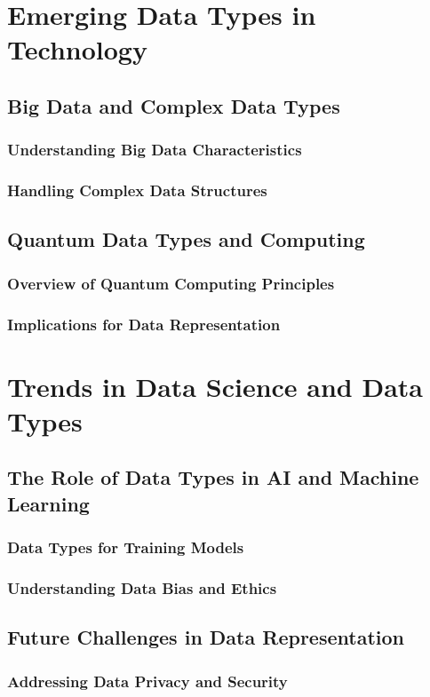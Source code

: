 \documentclass[12pt, oneside]{book}
\begin{document}
\section{Emerging Data Types in Technology}
\subsection{Big Data and Complex Data Types}
\subsubsection{Understanding Big Data Characteristics}
\subsubsection{Handling Complex Data Structures}
\subsection{Quantum Data Types and Computing}
\subsubsection{Overview of Quantum Computing Principles}
\subsubsection{Implications for Data Representation}
\section{Trends in Data Science and Data Types}
\subsection{The Role of Data Types in AI and Machine Learning}
\subsubsection{Data Types for Training Models}
\subsubsection{Understanding Data Bias and Ethics}
\subsection{Future Challenges in Data Representation}
\subsubsection{Addressing Data Privacy and Security}
\end{document}
